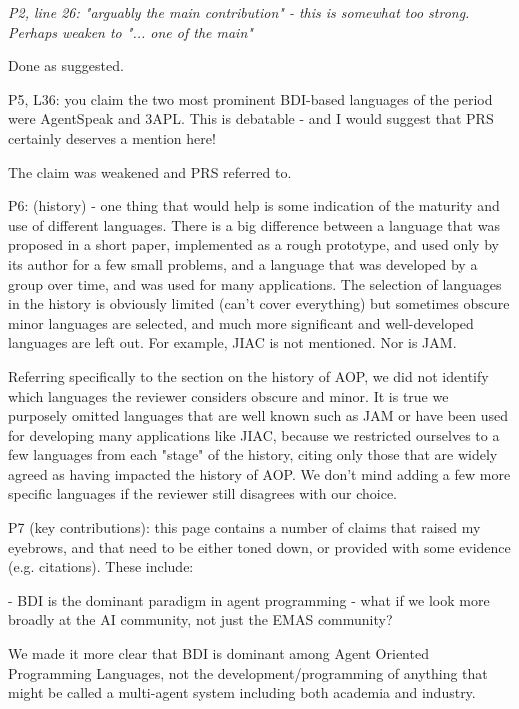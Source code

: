 \documentclass[12pt]{article}
\newenvironment{reviews}{\bigskip\itshape}{\upshape\bigskip}
\newenvironment{response}{\bigskip\normalfont}{\bigskip}
\begin{document}
\begin{reviews}
P2, line 26: "arguably the main contribution" - this is somewhat too strong. Perhaps weaken to "... one of the main"

\begin{response}
Done as suggested.
\end{response}

P5, L36: you claim the two most prominent BDI-based languages of the period were AgentSpeak and 3APL. This is debatable - and I would suggest that PRS certainly deserves a mention here! 

\begin{response}
The claim was weakened and PRS referred to.
\end{response}

P6: (history) - one thing that would help is some indication of the maturity and use of different languages. There is a big difference between a language that was proposed in a short paper, implemented as a rough prototype, and used only by its author for a few small problems, and a language that was developed by a group over time, and was used for many applications. The selection of languages in the history is obviously limited (can't cover everything) but sometimes obscure minor languages are selected, and much more significant and well-developed languages are left out. For example, JIAC is not mentioned. Nor is JAM. 

\begin{response}
Referring specifically to the section on the history of AOP, we did not identify which languages the reviewer considers obscure and minor. It is true we purposely omitted languages that are well known such as JAM or have been used for developing many applications like JIAC, because we restricted ourselves to a few languages from each "stage" of the history, citing only those that are widely agreed as having impacted the history of AOP. We don't mind adding a few more specific languages if the reviewer still disagrees with our choice.
\end{response}

P7 (key contributions): this page contains a number of claims that raised my eyebrows, and that need to be either toned down, or provided with some evidence (e.g. citations). These include:

- BDI is the dominant paradigm in agent programming - what if we look more broadly at the AI community, not just the EMAS community? 

\begin{response}
We made it more clear that BDI is dominant among Agent Oriented Programming Languages, not the development/programming of anything that might be called a multi-agent system including both academia and industry.
\end{response}


\end{reviews}
\end{document}
